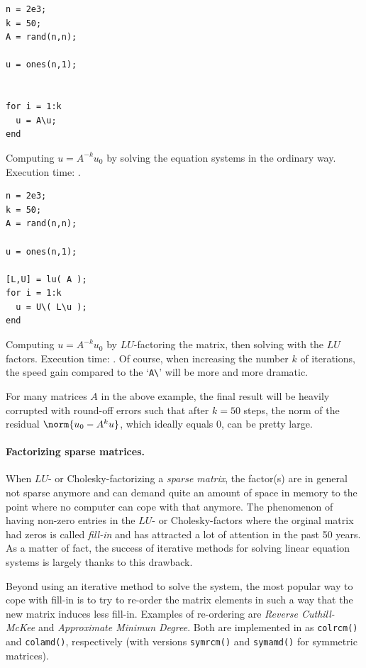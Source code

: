 \hfill
\begin{minipage}[t]{.45\textwidth}
\begin{lstlisting}[framerule=2pt,rulecolor=\color{badred}]
n = 2e3;
k = 50;
A = rand(n,n);

u = ones(n,1);


for i = 1:k
  u = A\u;
end
\end{lstlisting}
Computing $u = A^{-k}u_0$ by solving the equation systems in the ordinary way. Execution time: .
\end{minipage}
\hfill
\begin{minipage}[t]{.45\textwidth}
\begin{lstlisting}[framerule=2pt,rulecolor=\color{goodgreen}]
n = 2e3;
k = 50;
A = rand(n,n);

u = ones(n,1);

[L,U] = lu( A );
for i = 1:k
  u = U\( L\u );
end
\end{lstlisting}
Computing $u = A^{-k}u_0$ by $LU$-factoring the matrix, then solving with the $LU$ factors. Execution time: . Of course, when increasing  the number $k$ of iterations, the speed gain compared to the `\lstinline!A\!' will  be more and more dramatic.
\end{minipage}
\hfill

\begin{remark}
For many matrices $A$ in the above example, the final result will be heavily corrupted with round-off errors such that after $k=50$ steps, the norm of the residual $\norm{u_0-A^ku}$, which ideally equals $0$, can be pretty large.
\end{remark}


\paragraph{Factorizing sparse matrices.}
When $LU$- or Cholesky-factorizing a \emph{sparse matrix}, the factor(s) are in general not sparse anymore and can demand quite an amount of space in memory to the point where no computer can cope with that anymore. The phenomenon of having non-zero entries in the $LU$- or Cholesky-factors where the orginal matrix had zeros is called \emph{fill-in} and has attracted a lot of attention in the past 50 years. As a matter of fact, the success of iterative methods for solving linear equation systems is largely thanks to this drawback.

Beyond using an iterative method to solve the system, the most popular way to cope with fill-in is to try to re-order the matrix elements in such a way that the new matrix induces less fill-in. Examples of re-ordering are \emph{Reverse Cuthill-McKee} and \emph{Approximate Minimun Degree}. Both are implemented in \matlab{} as \lstinline!colrcm()! and \lstinline!colamd()!, respectively (with versions \lstinline!symrcm()! and \lstinline!symamd()! for symmetric matrices).

